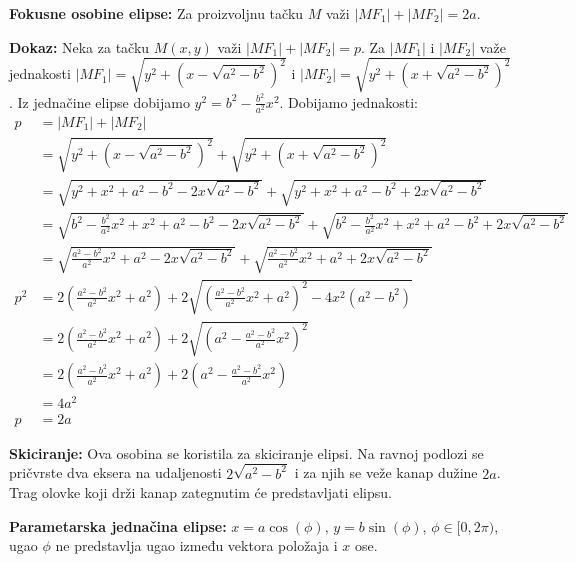 \documentclass[12pt]{article}
\begin{document}
\textbf{Fokusne osobine elipse:} Za proizvoljnu tačku $M$ važi
$|MF_1|+|MF_2|=2a$.
\par
\textbf{Dokaz:} Neka za tačku $M(x,y)$ važi $|MF_1|+|MF_2|=p$. Za $|MF_1|$
i $|MF_2|$ važe jednakosti $|MF_1|=\sqrt{y^2+(x-\sqrt{a^2-b^2})^2}$ i
$|MF_2|=\sqrt{y^2+(x+\sqrt{a^2-b^2})^2}$. Iz jednačine elipse dobijamo
$y^2=b^2-\frac{b^2}{a^2}x^2$. Dobijamo jednakosti:
\begin{align*}
    p   & =|MF_1|+|MF_2|                                                                                                         \\
        & =\sqrt{y^2+(x-\sqrt{a^2-b^2})^2}+\sqrt{y^2+(x+\sqrt{a^2-b^2})^2}                                                       \\
        & =\sqrt{y^2+x^2+a^2-b^2-2x\sqrt{a^2-b^2}}+\sqrt{y^2+x^2+a^2-b^2+2x\sqrt{a^2-b^2}}                                       \\
        & =\sqrt{b^2-\frac{b^2}{a^2}x^2+x^2+a^2-b^2-2x\sqrt{a^2-b^2}}+\sqrt{b^2-\frac{b^2}{a^2}x^2+x^2+a^2-b^2+2x\sqrt{a^2-b^2}} \\
        & =\sqrt{\frac{a^2-b^2}{a^2}x^2+a^2-2x\sqrt{a^2-b^2}}+\sqrt{\frac{a^2-b^2}{a^2}x^2+a^2+2x\sqrt{a^2-b^2}}                 \\
    p^2 & =2(\frac{a^2-b^2}{a^2}x^2+a^2)+2\sqrt{(\frac{a^2-b^2}{a^2}x^2+a^2)^2-4x^2(a^2-b^2)}                                    \\
        & =2(\frac{a^2-b^2}{a^2}x^2+a^2)+2\sqrt{(a^2-\frac{a^2-b^2}{a^2}x^2)^2}                                                  \\
        & =2(\frac{a^2-b^2}{a^2}x^2+a^2)+2(a^2-\frac{a^2-b^2}{a^2}x^2)                                                           \\
        & =4a^2                                                                                                                  \\
    p   & =2a
\end{align*}
\par

\textbf{Skiciranje:} Ova osobina se koristila za skiciranje elipsi. Na ravnoj
podlozi se pričvrste dva eksera na udaljenosti $2\sqrt{a^2-b^2}$ i za
njih se veže kanap dužine $2a$. Trag olovke koji drži kanap zategnutim će
predstavljati elipsu.
\par

\textbf{Parametarska jednačina elipse:} $x=a\cos(\phi)$, $y=b\sin(\phi)$,
$\phi\in[0,2\pi)$, ugao $\phi$ ne predstavlja ugao između vektora položaja
i $x$ ose.
\end{document}
